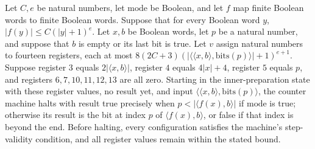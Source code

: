 \begin{lemma}
\label{Complexity.comp_valid_inner}
\leanok
{}
Let $C,e$ be natural numbers, let $\mathrm{mode}$ be Boolean, and let $f$ map finite
Boolean words to finite Boolean words. Suppose that for every Boolean word $y$,
$|f(y)|\le C(|y|+1)^e$. Let $x,b$ be Boolean words, let $p$ be a natural number, and
suppose that $b$ is empty or its last bit is true. Let $v$ assign natural numbers to
fourteen registers, each at most $8(2C+3)(|\langle\langle
x,b\rangle,\mathrm{bits}(p)\rangle|+1)^{e+1}$. Suppose register $3$ equals $2|\langle
x,b\rangle|$, register $4$ equals $4|x|+4$, register $5$ equals $p$, and registers
$6,7,10,11,12,13$ are all zero. Starting in the inner-preparation state with these
register values, no result yet, and input $\langle\langle
x,b\rangle,\mathrm{bits}(p)\rangle$, the counter machine halts with result true
precisely when $p<|\langle f(x),b\rangle|$ if $\mathrm{mode}$ is true; otherwise its
result is the bit at index $p$ of $\langle f(x),b\rangle$, or false if that index is
beyond the end. Before halting, every configuration satisfies the machine's
step-validity condition, and all register values remain within the stated bound.
\end{lemma}


